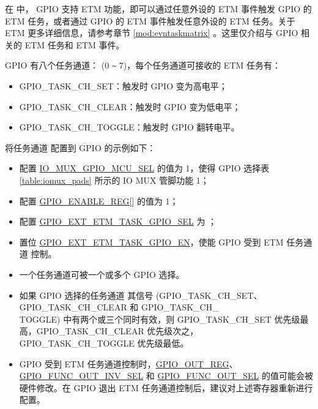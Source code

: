 \documentclass[main\_\_CN.tex]{subfiles}
\begin{document}
在 \chipname{} 中， GPIO 支持 ETM 功能，即可以通过任意外设的 ETM 事件触发 GPIO 的 ETM 任务，或者通过 GPIO 的 ETM 事件触发任意外设的 ETM 任务。关于 ETM 更多详细信息，请参考章节 \ref{mod:evntaskmatrix} \textit{}。这里仅介绍与 GPIO 相关的 ETM 任务和 ETM 事件。

GPIO 有八个任务通道： (0 \verb+~+ 7)，每个任务通道可接收的 ETM 任务有：

\begin{itemize}
    \item GPIO\_TASK\_CH\_SET：触发时 GPIO 变为高电平；
    \item GPIO\_TASK\_CH\_CLEAR：触发时 GPIO 变为低电平；
    \item GPIO\_TASK\_CH\_TOGGLE：触发时 GPIO 翻转电平。
\end{itemize}

将任务通道  配置到 GPIO 的示例如下：

\begin{itemize}
    \item 配置 \hyperref[fielddesc:IOMUXGPIONMCUSEL]{IO\_MUX\_GPIO\_MCU\_SEL} 的值为 1，使得 GPIO 选择表 \ref{table:iomux_pads} 所示的 IO MUX 管脚功能 1；
    \item 配置 \hyperref[regdesc:GPIOENABLEREG]{GPIO\_ENABLE\_REG[]} 的值为 1；
    \item 配置 \hyperref[fielddesc:GPIOSDETMTASKGPIO0SEL]{GPIO\_EXT\_ETM\_TASK\_GPIO\_SEL} 为 ；
    \item 置位 \hyperref[fielddesc:GPIOSDETMTASKGPIO0EN]{GPIO\_EXT\_ETM\_TASK\_GPIO\_EN}，使能 GPIO 受到 ETM 任务通道  控制。
\end{itemize}

\begin{tiplisting}
\vspace{-2em}
\begin{itemize}
\item 一个任务通道可被一个或多个 GPIO 选择。

\item 如果 GPIO 选择的任务通道  其信号 (GPIO\_TASK\_CH\_SET、GPIO\_TASK\_CH\_CLEAR 和 GPIO\_TASK\_CH\_\\TOGGLE) 中有两个或三个同时有效，则 GPIO\_TASK\_CH\_SET 优先级最高，GPIO\_TASK\_CH\_CLEAR 优先级次之，GPIO\_TASK\_CH\_TOGGLE 优先级最低。

\item GPIO 受到 ETM 任务通道控制时，\hyperref[regdesc:GPIOOUTREG]{GPIO\_OUT\_REG}、\hyperref[fielddesc:GPIOFUNCNOUTINVSEL]{GPIO\_FUNC\_OUT\_INV\_SEL} 和 \hyperref[fielddesc:GPIOFUNCNOUTSEL]{GPIO\_FUNC\_OUT\_SEL} 的值可能会被硬件修改。在 GPIO 退出 ETM 任务通道控制后，建议对上述寄存器重新进行配置。
\end{itemize}
\end{tiplisting}
\end{document}
